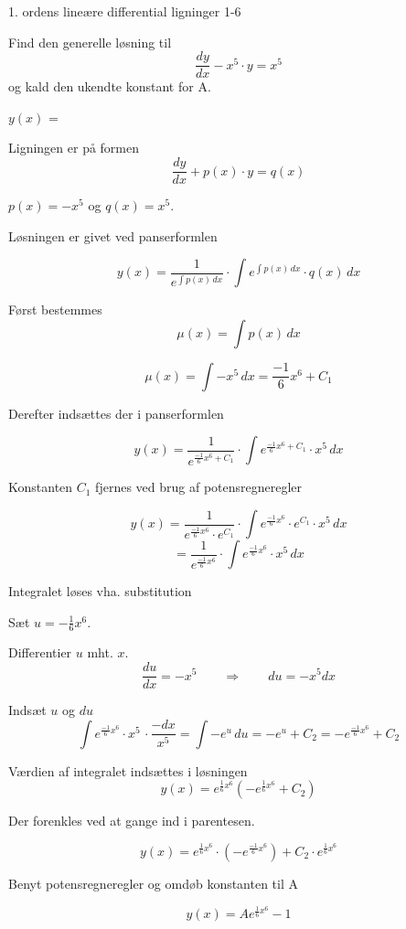 \documentclass{article}
\begin{document}
\newpage

\begin{exercise}{1. ordens lineære differential ligninger 1-6}


Find den generelle løsning til
\[
\frac{dy}{dx} - x^5 \cdot y = x^5
\]
og kald den ukendte konstant for A.

$y(x)$ = 



\hint

Ligningen er på formen
\[
\frac{dy}{dx} + p(x) \cdot y = q(x)
\]

\hint

$p(x)=-x^5$ og $q(x)=x^5$.

\hint

Løsningen er givet ved panserformlen


\hint

\[
y(x) = \frac{1}{e^{\int p(x) \, dx}} \cdot \int e^{\int p(x) \, dx} \cdot q(x) \, dx
\]

\hint

Først bestemmes
\[
\mu(x) = \int p(x) \, dx
\]

\hint
\[
\mu(x) = \int -x^5 \, dx = \frac{-1}{6} x^6 + C_1
\]

\hint
Derefter indsættes der i panserformlen

\hint

\[
y(x) = \frac{1}{e^{\frac{-1}{6}x^6 + C_1}} \cdot \int e^{\frac{-1}{6}x^6 + C_1} \cdot x^5 \, dx
\]


\hint

Konstanten $C_1$ fjernes ved brug af potensregneregler

\hint
\[
y(x) = \frac{1}{e^{\frac{-1}{6}x^6} \cdot e^{C_1}} \cdot \int e^{\frac{-1}{6}x^6} \cdot e^{C_1} \cdot x^5 \, dx
\]
\[
= \frac{1}{e^{\frac{-1}{6}x^6}} \cdot \int e^{\frac{-1}{6}x^6} \cdot x^5 \, dx
\]

\hint

Integralet løses vha. substitution


\hint
Sæt $u = - \frac{1}{6}x^6$.

\hint

Differentier $u$ mht. $x$.
\[
\frac{du}{dx} = -x^5 \qquad\Rightarrow \qquad du = -x^5 dx
\]

\hint
Indsæt $u$ og $du$
\[
\int e^{\frac{-1}{6}x^6} \cdot x^5 \, \cdot \frac{-dx}{x^5} = \int -e^{u} \, du = -e^{u} + C_2 = -e^{\frac{-1}{6}x^6} + C_2
\]

\hint

Værdien af integralet indsættes i løsningen
\[
y(x) = e^{\frac{1}{6}x^6} \left(-e^{\frac{1}{6}x^6} + C_2\right)
\]

\hint

Der forenkles ved at gange ind i parentesen.

\hint
\[
y(x) = e^{\frac{1}{6}x^6} \cdot \left(-e^{\frac{-1}{6}x^6} \right) + C_2 \cdot e^{\frac{1}{6}x^6}
\]

\hint

Benyt potensregneregler og omdøb konstanten til A

\hint
\[
y(x) = A e^{\frac{1}{6}x^6} - 1
\]


\end{exercise}
\end{document}
